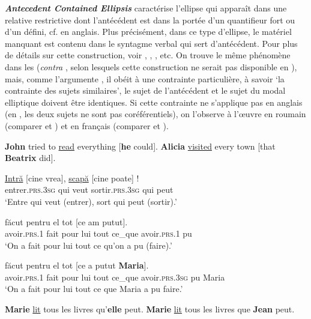 \textbf{\textit{Antecedent Contained Ellipsis}} \citep{Bouton1970} caractérise l’ellipse qui apparaît dans une relative restrictive dont l’antécédent est dans la portée d’un quantifieur fort ou d’un défini, cf.  en anglais. Plus précisément, dans ce type d’ellipse, le matériel manquant est contenu dans le syntagme verbal qui sert d’antécédent. Pour plus de détails sur cette construction, voir \citet{Baltin1987}, \citet{Kennedy1997}, \citet{Lappin1999}, etc. On trouve le même phénomène dans les  (\textit{contra} \citealt{CecchettoEtAl2006}, selon lesquels cette construction ne serait pas disponible en ), mais, comme l’argumente \citet{Dagnac2008,Dagnac2010}, il obéit à une contrainte particulière, à savoir ‘la contrainte des sujets similaires’, {\cad} le sujet de l’antécédent et le sujet du modal elliptique doivent être identiques. Si cette contrainte ne s’applique pas en anglais (en , les deux sujets ne sont pas coréférentiels), on l’observe à l’œuvre en roumain (comparer  et ) et en français (comparer  et ).

\ea \label{ch1:ex69}
\ea  \textbf{John} tried to \uline{read} everything [\textbf{he} could]. \label{ch1:ex69a}
\ex  \textbf{Alicia} \uline{visited} every town [that \textbf{Beatrix} did]. \label{ch1:ex69b}
\z
\z

\ea
\ea
\gll   \uline{Intră}  [cine  vrea],  \uline{scapă}  [cine  poate] ! \label{ch1:ex70a}\\
entrer.\textsc{prs.3sg}  qui  veut  sortir.\textsc{prs.3sg}  qui  peut\\
\glt ‘\textsc{E}ntre qui veut (entrer), sort qui peut (sortir).’ 

\ex
\gll  {} făcut  pentru  el  tot  [ce  am  putut]. \label{ch1:ex70b} \\
    avoir\textsc{.prs.1}  fait  pour  lui  tout  ce\_que  avoir.\textsc{prs.1}  pu\\
\glt ‘On a fait pour lui tout ce qu’on a pu (faire).’ 

\ex
\gll   * făcut pentru  el  tot  [ce  a  putut  \textbf{Maria}]. \label{ch1:ex70c}\\
    avoir\textsc{.prs.1}  fait  pour  lui  tout  ce\_que  avoir.\textsc{prs.3sg}  pu  Maria\\
\glt ‘On a fait pour lui tout ce que Maria a pu faire.’ 
\z
\z


\ea
\ea  \textbf{Marie} \uline{lit} tous les livres qu’\textbf{elle} peut. \label{ch1:ex71a}
\ex  *\textbf{Marie} \uline{lit} tous les livres que \textbf{Jean} peut. \label{ch1:ex71b}  
\z
\z

